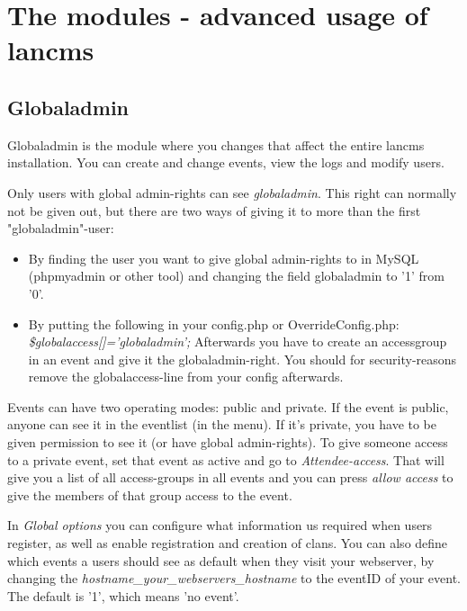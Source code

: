 \chapter{The modules - advanced usage of lancms}

\section{Globaladmin}

Globaladmin is the module where you changes that affect the entire lancms
installation. You can create and change events, view the logs and modify
users.

Only users with global admin-rights can see \textit{globaladmin}. This
right can normally not be given out, but there are two ways of giving it to
more than the first "globaladmin"-user:
\begin{itemize}
\item By finding the user you want to give global admin-rights to in MySQL
(phpmyadmin or other tool) and changing the field globaladmin to
'1' from '0'.
\item By putting the following in your config.php or OverrideConfig.php: \textit{\$globalaccess[]='globaladmin';}
Afterwards you have to create an
accessgroup in an event and give it the globaladmin-right. You should for
security-reasons remove the globalaccess-line from your config afterwards.
\end{itemize}

Events can have two operating modes: public and private. If the event is
public, anyone can see it in the eventlist (in the menu). If it's private, you
have to be given permission to see it (or have global admin-rights). To give
someone access to a private event, set that event as active and go to
\textit{Attendee-access}. That will give you a list of all access-groups in
all events and you can press \textit{allow access} to give the members of
that group access to the event.

In \textit{Global options} you can configure what information us required when users register, as well as enable registration and creation of clans.
You can also define which events a users should see as default when they visit your webserver, by changing the \textit{hostname\_your\_webservers\_hostname} to the eventID of your event. The default is '1', which means 'no event'.


